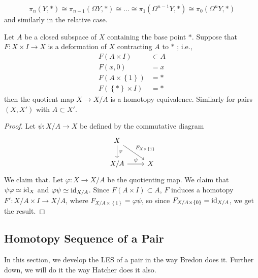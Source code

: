   \begin{corollary}
      \[
      \pi_n\left( Y,* \right) \cong
      \pi_{n-1}\left( \Omega Y, * \right) 
      \cong \ldots \cong
      \pi_1\left( \Omega^{n-1}Y,* \right) 
      \cong \pi_0 \left( \Omega^{n}Y ,* \right) 
      \] 
      and similarly in the relative case.
  \end{corollary}

  \begin{theorem}[]
      Let $A$ be a closed subspace of $X$ containing the
      base point $*$. Suppose that $F \colon X \times I \to X$ 
      is a deformation of $X$ contracting $A$ to
      $*$ ; i.e.,
      \begin{align*}
          F(A \times I) 
          &\subset A\\
          F(x,0) 
          &= x\\
          F\left( A \times \left\{ 1 \right\}  \right) 
          &= *\\
          F\left( \left\{ * \right\} \times I \right) 
          &= *
      \end{align*}
      then the quotient map $X \to X /A$ is a homotopy equivalence.
      Similarly for pairs $\left( X,X' \right) $ with
      $A \subset X'$.
  \end{theorem}

  \begin{proof}
      Let
      $\psi \colon X / A \to X$ be defined by the
      commutative diagram
      \begin{equation*}
      \begin{tikzcd}
          X \ar[d, "\varphi "] 
          \ar[dr, "F_{X \times \left\{ 1 \right\} } "]& \\
          X / A \ar[r, "\psi"] & X
      \end{tikzcd}
      \end{equation*}
      We claim that. Let $\varphi \colon X \to X / A$ be
      the quotienting map. We claim that
      $\psi \varphi \simeq {\mathrm{id}}_{X}$ and
      $\varphi \psi \simeq {\mathrm{id}}_{X / A}$.
      Since $F\left( A \times I \right) \subset A$, 
      $F$ induces a homotopy
      $F' \colon X / A \times I \to X / A$, where
      $F_{X / A \times \left\{ 1 \right\} }
      = \varphi \psi $, so
      since $F_{X / A \times \left\{ 0 \right\} }
      = {\mathrm{id}}_{X / A}$, we get the result.
  \end{proof}

  \subsection{Homotopy Sequence of a Pair}
  In this section, we develop the LES of a pair
  in the way Bredon does it. Further down, we will do
  it the way Hatcher does it also.

